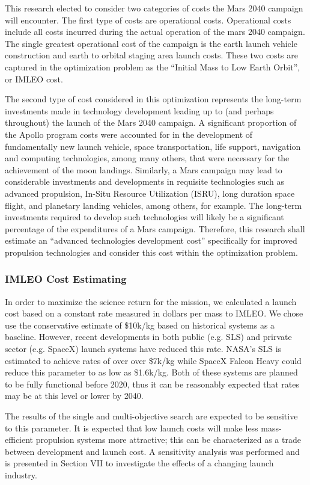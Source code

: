\documentclass[]{aiaa-pretty}
\begin{document}
This research elected to consider two categories of costs the Mars 2040 campaign will encounter. The first type of costs are operational costs. Operational costs include all costs incurred during the actual operation of the mars 2040 campaign. The single greatest operational cost of the campaign is the earth launch vehicle construction and earth to orbital staging area launch costs. These two costs are captured in the optimization problem as the “Initial Mass to Low Earth Orbit”, or IMLEO cost. 

The second type of cost considered in this optimization represents the long-term investments made in technology development leading up to (and perhaps throughout) the launch of the Mars 2040 campaign. A significant proportion of the Apollo program costs were accounted for in the development of fundamentally new launch vehicle, space transportation, life support, navigation and computing technologies, among many others, that were necessary for the achievement of the moon landings. Similarly, a Mars campaign may lead to considerable investments and developments in requisite technologies such as advanced propulsion, In-Situ Resource Utilization (ISRU), long duration space flight, and planetary landing vehicles, among others, for example. The long-term investments required to develop such technologies will likely be a significant percentage of the expenditures of a Mars campaign. Therefore, this research shall estimate an “advanced technologies development cost” specifically for improved propulsion technologies and consider this cost within the optimization problem. 

\subsubsection{IMLEO Cost Estimating}
In order to maximize the science return for the mission, we calculated a launch cost based on a constant rate measured in dollars per mass to IMLEO. We chose use the conservative estimate of \$10k/kg based on historical systems as a baseline. However, recent developments in both public (e.g. SLS) and prirvate sector (e.g. SpaceX) launch systems have reduced this rate. NASA’s SLS is estimated to achieve rates of over over \$7k/kg while SpaceX Falcon Heavy could reduce this parameter to as low as \$1.6k/kg. \cite{jones2015estimating} Both of these systems are planned to be fully functional before 2020, thus it can be reasonably expected that rates may be at this level or lower by 2040. 

The results of the single and multi-objective search are expected to be sensitive to this parameter. It is expected that low launch costs will make less mass-efficient propulsion systems more attractive; this can be characterized as a trade between development and launch cost. A sensitivity analysis was performed and is presented in Section VII to investigate the effects of a changing launch industry. 	
\end{document}
